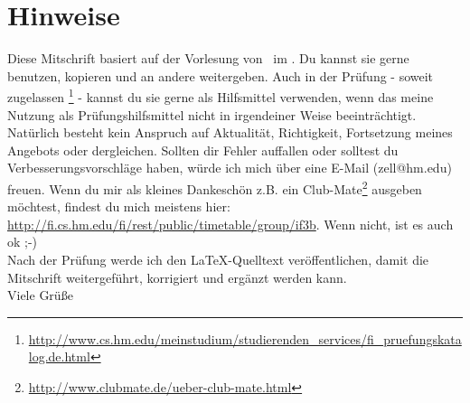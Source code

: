 \renewcommand{\ldate}{2015-03-16}

\section{Hinweise}
Diese Mitschrift basiert auf der Vorlesung \textquote{\pTitle} von \pProfessor \ im \pSemester. Du kannst sie gerne benutzen, kopieren und an andere weitergeben. Auch in der Prüfung - soweit zugelassen \footnote{\url{http://www.cs.hm.edu/meinstudium/studierenden_services/fi_pruefungskatalog.de.html}} - kannst du sie gerne als Hilfsmittel verwenden, wenn das meine Nutzung als Prüfungshilfsmittel nicht in irgendeiner Weise beeinträchtigt.\\

Natürlich besteht kein Anspruch auf Aktualität, Richtigkeit, Fortsetzung meines Angebots oder dergleichen. Sollten dir Fehler auffallen oder solltest du Verbesserungsvorschläge haben, würde ich mich über eine E-Mail (zell@hm.edu) freuen. Wenn du mir als kleines Dankeschön z.B. ein Club-Mate\footnote{\url{http://www.clubmate.de/ueber-club-mate.html}} ausgeben möchtest, findest du mich meistens hier: \url{http://fi.cs.hm.edu/fi/rest/public/timetable/group/if3b}. Wenn nicht, ist es auch ok ;-)\\

Nach der Prüfung werde ich den \LaTeX-Quelltext veröffentlichen, damit die Mitschrift weitergeführt, korrigiert und ergänzt werden kann.\\

Viele Grüße\\
\pShortName